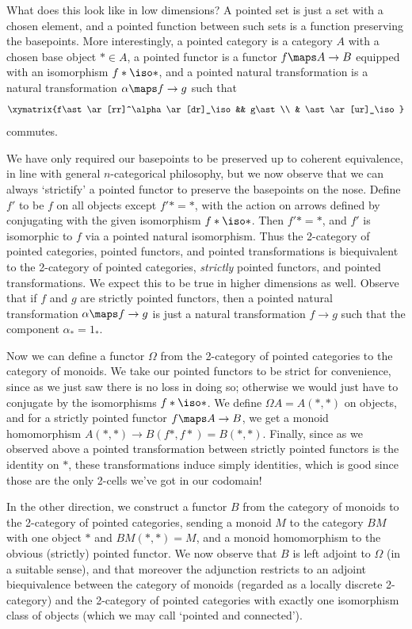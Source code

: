 \documentclass{amsart}
\begin{document}
What does this look like in low dimensions?  A pointed set is just a
set with a chosen element, and a pointed function between such sets is
a function preserving the basepoints.  More interestingly, a pointed
category is a category $A$ with a chosen base object $*\in A$, a
pointed functor is a functor $f\maps A\to B$ equipped with an
isomorphism $f*\iso *$, and a pointed natural transformation is a
natural transformation $\alpha\maps f\to g$ such that
\[\xymatrix{f\ast \ar[rr]^\alpha \ar[dr]_\iso && g\ast\\ & \ast\ar[ur]_\iso}\]
commutes.

We have only required our basepoints to be preserved up to coherent
equivalence, in line with general $n$-categorical philosophy, but we
now observe that we can always `strictify' a pointed functor to
preserve the basepoints on the nose.  Define $f'$ to be $f$ on all
objects except $f'*=*$, with the action on arrows defined by
conjugating with the given isomorphism $f*\iso *$.  Then $f'*=*$, and
$f'$ is isomorphic to $f$ via a pointed natural isomorphism.  Thus the
2-category of pointed categories, pointed functors, and pointed
transformations is biequivalent to the 2-category of pointed
categories, \emph{strictly} pointed functors, and pointed
transformations.  We expect this to be true in higher dimensions as
well.  Observe that if $f$ and $g$ are strictly pointed functors, then
a pointed natural transformation $\alpha\maps f\to g$ is just a
natural transformation $f\to g$ such that the component $\alpha_* =
1_*$.

Now we can define a functor $\Omega$ from the 2-category of pointed
categories to the category of monoids.  We take our pointed functors
to be strict for convenience, since as we just saw there is no loss in
doing so; otherwise we would just have to conjugate by the
isomorphisms $f*\iso *$.  We define $\Omega A = A(*,*)$ on objects,
and for a strictly pointed functor $f\maps A\to B$, we get a monoid
homomorphism $A(*,*)\to B(f*,f*) = B(*,*)$.  Finally, since as we
observed above a pointed transformation between strictly pointed
functors is the identity on $*$, these transformations induce simply
identities, which is good since those are the only 2-cells we've got
in our codomain!

In the other direction, we construct a functor $B$ from the category
of monoids to the 2-category of pointed categories, sending a monoid
$M$ to the category $BM$ with one object $*$ and $BM(*,*)=M$, and a
monoid homomorphism to the obvious (strictly) pointed functor.  We now
observe that $B$ is left adjoint to $\Omega$ (in a suitable sense),
and that moreover the adjunction restricts to an adjoint biequivalence
between the category of monoids (regarded as a locally discrete
2-category) and the 2-category of pointed categories with exactly one
isomorphism class of objects (which we may call `pointed and
connected').
\end{document}

